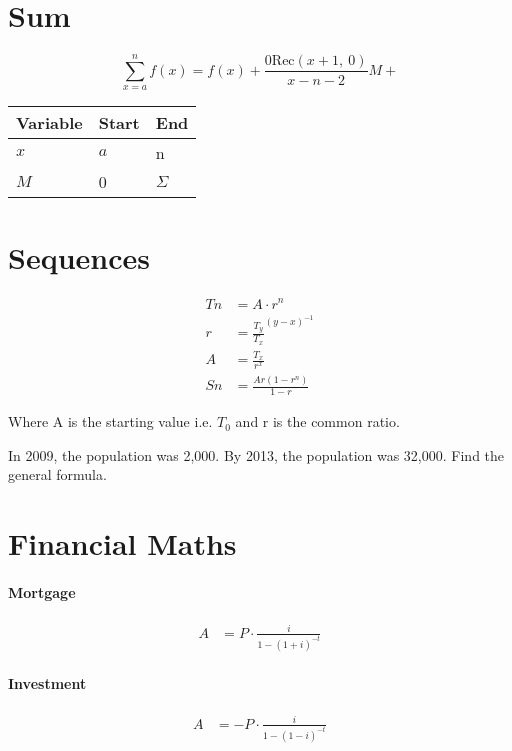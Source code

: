 \documentclass[11pt]{article}
\newcommand{\Rec}{\text{Rec}}
\begin{document}
    \section{Sum}\label{sec:sum}
    \[
        \sum_{x=a}^{n} f\left(x\right) =
        f(x) + \frac{0\Rec\left( x+1,~0\right)} {x -n -2} M+
    \]


    \begin{center}
        \begin{tabular}{|l|l|l|}
            \hline
            Variable & Start & End      \\
            \hline
            $x$      & $a$   & n        \\
            \hline
            $M$      & 0     & $\Sigma$ \\
            \hline
        \end{tabular}
    \end{center}


    \section{Sequences}\label{sec:sequences}
    \begin{align}
        Tn &=  A \cdot r^n \\
        r &=  {\frac {T_y} {T_x} } ^ { \left( y-x \right) ^ {-1} }  \\
        A &= \frac {T_x} {r^x}  \\
        Sn &= \frac{ Ar \left( 1 - r^n \right) } { 1 - r }
    \end{align}

    Where A is the starting value i.e. $T_0$ and r is the common ratio.


    In 2009, the population was 2,000.
    By 2013, the population was 32,000.
    Find the general formula.


    \section{Financial Maths}\label{sec:financial-maths}
    \paragraph{Mortgage}
    \begin{align}
        A &= P \cdot \frac {i} { 1- \left(1+i\right) ^{-t}}
    \end{align}

    \paragraph{Investment}
    \begin{align}
        A &= -P \cdot \frac {i} { 1- \left(1-i\right) ^{-t}}
    \end{align}
\end{document}

